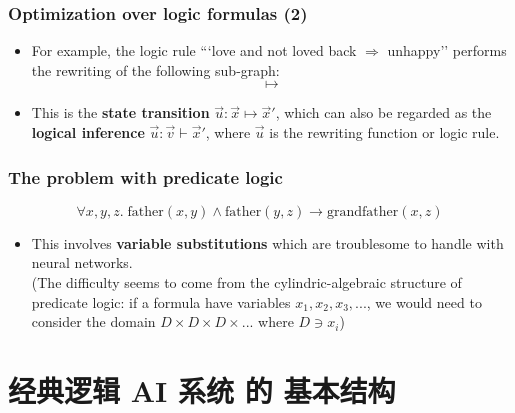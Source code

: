 \documentclass[17pt]{beamer}
\begin{document}
\begin{frame}
\frametitle{Optimization over logic formulas (2)}
\begin{itemize}
	\item For example, the logic rule ```love and not loved back $\Rightarrow$ unhappy'' performs the rewriting of the following sub-graph:
	\begin{equation}
	\quad \mapsto \quad
	\end{equation}
	\item This is the \textbf{state transition} $\vec{u}: \vec{x} \mapsto \vec{x}'$, which can also be regarded as the \textbf{logical inference} $\vec{u}: \vec{v} \vdash \vec{x}'$, where $\vec{u}$ is the rewriting function or logic rule.
\end{itemize}
\end{frame}

\begin{frame}
\frametitle{The problem with predicate logic}
\begin{equation}
\forall x,y,z. \; \mbox{father}(x,y) \wedge \mbox{father}(y,z) \rightarrow \mbox{grandfather}(x,z)
\end{equation}
\begin{itemize}
	\item This involves \textbf{variable substitutions} which are troublesome to handle with neural networks. \\
	(The difficulty seems to come from the cylindric-algebraic structure of predicate logic:  if a formula have variables $x_1, x_2, x_3, ...$, we would need to consider the domain $D \times D \times D \times ...$ where $D \ni x_i$)
\end{itemize}
\end{frame}

\section{经典逻辑 AI 系统 的 基本结构}


\end{document}
